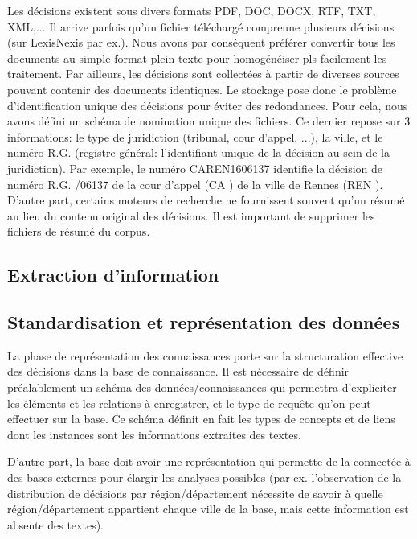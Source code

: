 Les décisions existent sous divers formats PDF, DOC, DOCX, RTF, TXT, XML,... Il arrive parfois qu'un fichier téléchargé comprenne plusieurs décisions (sur LexisNexis par ex.). Nous avons par conséquent préférer convertir tous les documents au simple format plein texte pour homogénéiser pls facilement les traitement. Par ailleurs, les décisions sont collectées à partir de diverses sources pouvant contenir des documents identiques. Le stockage pose donc le problème d'identification unique des décisions pour éviter des redondances. Pour cela, nous avons défini un schéma de nomination unique des fichiers. Ce dernier repose sur 3 informations: le type de juridiction (tribunal, cour d'appel, ...), la ville, et le numéro R.G. (registre général: l'identifiant unique de la décision au sein de la juridiction). Par exemple, le numéro \og CAREN1606137 \fg{} identifie la décision de numéro R.G. /06137 \fg{} de la cour d'appel (\og CA \fg{}) de la ville de Rennes (\og REN \fg{}). D'autre part, certains moteurs de recherche ne fournissent souvent qu'un résumé au lieu du contenu original des décisions. Il est important de  supprimer les fichiers de résumé du corpus.

\subsection{Extraction d'information}

\subsection{Standardisation et représentation des données}
La phase de représentation des connaissances porte sur la structuration effective des décisions dans la base de connaissance. Il est nécessaire de définir préalablement un schéma des données/connaissances qui permettra d'expliciter les éléments et les relations à enregistrer, et le type de requête qu'on peut effectuer sur la base. Ce schéma définit en fait les types de concepts et de liens dont les instances sont les informations extraites des textes.

D'autre part, la base doit avoir une représentation qui permette de la connectée à des bases externes pour élargir les analyses possibles (par ex. l'observation de la distribution de décisions par région/département nécessite de savoir à quelle région/département appartient chaque ville de la base, mais cette information est absente des textes).

